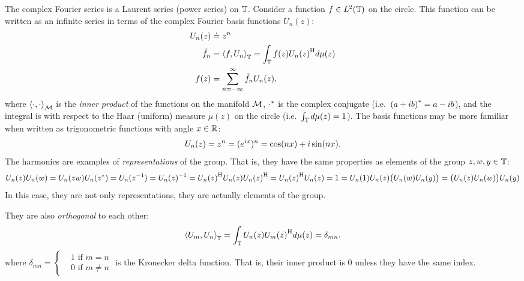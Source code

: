 \documentclass[../main.tex]{subfiles}
\begin{document}
\begin{refsection}
The complex Fourier series is a Laurent series (power series) on $\mathbb{T}$.
Consider a function $f \in L^2(\mathbb{T})$  on the circle.
This function can be written as an infinite series in terms of the complex Fourier basis functions $U_n(z)$:
\[
\begin{aligned}
  U_n(z) &\doteq z^n \\
  \tilde{f}_n &= \left\langle f, U_n \right\rangle_{\mathbb{T}}
              = \int_{\mathbb{T}} f(z) {U_n(z)}^\mathrm{H} d\mu(z)\\
  f(z) &= \sum_{n=-\infty}^\infty \tilde{f}_n U_n(z),\\
\end{aligned}
\]
where $\left\langle \cdot, \cdot \right\rangle_{\mathcal{M}}$ is the \emph{inner product} of the functions on the manifold $\mathcal{M}$, ${\cdot}^*$ is the complex conjugate (i.e.~${(a + i b)}^* = a - i b$), and the integral is with respect to the Haar (uniform) measure $\mu(z)$ on the circle (i.e.~$\int_{\mathbb{T}} d\mu(z) = 1$).
The basis functions may be more familiar when written as trigonometric functions with angle $x \in \mathbb{R}$:
\[U_n(z) = z^n = (e^{i x})^n = \cos (nx) + i \sin(nx).\]
The harmonics are examples of \emph{representations} of the group.
That is, they have the same properties as elements of the group $z,w,y \in \mathbb{T}$:
\[
  U_n(z)U_n(w) = U_n(zw)\\
  U_n({z}^*) = U_n(z^{-1}) = U_n(z)^{-1} = {U_n(z)}^\mathrm{H}\\
  U_n(z) {U_n(z)}^\mathrm{H} = {U_n(z)}^\mathrm{H} U_n(z) = 1 = U_n(1)\\
  U_n(z) \bigl(U_n(w) U_n(y)\bigr) = \bigl(U_n(z) U_n(w)\bigr) U_n(y)
\]
In this case, they are not only representations, they are actually elements of the group.

They are also \emph{orthogonal} to each other:
\[\left\langle U_m, U_n \right\rangle_{\mathbb{T}} = \int_{\mathbb{T}} U_n(z) {U_m(z)}^\mathrm{H} d\mu(z) = \delta_{mn}.\]
where $\delta_{mn} = \begin{cases} &1 \text{ if } m = n\\ &0 \text{ if } m \ne n\end{cases}$ is the Kronecker delta function.
That is, their inner product is 0 unless they have the same index.


\end{refsection}
\end{document}
